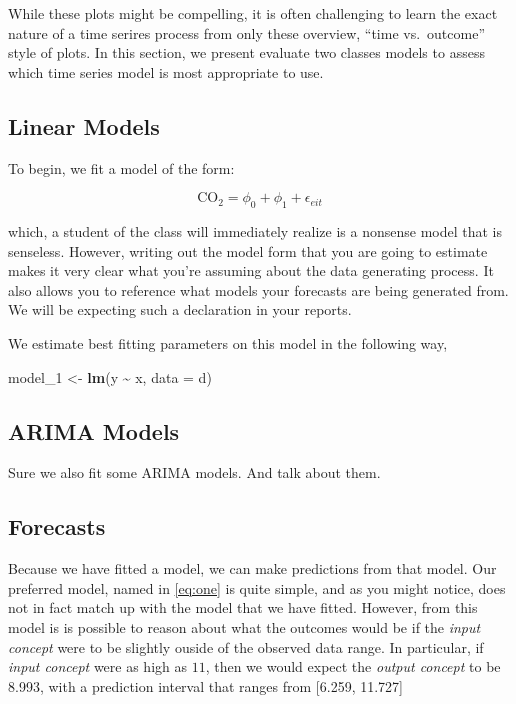 \documentclass[AER]{AEA}
\newenvironment{Shaded}{\begin{snugshade}}{\end{snugshade}}
\newcommand{\AttributeTok}[1]{\textcolor[rgb]{0.13,0.29,0.53}{#1}}
\newcommand{\FunctionTok}[1]{\textcolor[rgb]{0.13,0.29,0.53}{\textbf{#1}}}
\newcommand{\NormalTok}[1]{#1}
\newcommand{\OtherTok}[1]{\textcolor[rgb]{0.56,0.35,0.01}{#1}}
\newcommand{\SpecialCharTok}[1]{\textcolor[rgb]{0.81,0.36,0.00}{\textbf{#1}}}
\begin{document}
While these plots might be compelling, it is often challenging to learn
the exact nature of a time serires process from only these overview,
``time vs.~outcome'' style of plots. In this section, we present
evaluate two classes models to assess which time series model is most
appropriate to use.

\hypertarget{linear-models}{%
\subsection{Linear Models}\label{linear-models}}

To begin, we fit a model of the form:

\begin{equation}
\label{eq:one}
\text{CO}_{2} = \phi_{0} + \phi_{1} + \epsilon_{eit}
\end{equation}

which, a student of the class will immediately realize is a nonsense
model that is senseless. However, writing out the model form that you
are going to estimate makes it very clear what you're assuming about the
data generating process. It also allows you to reference what models
your forecasts are being generated from. We will be expecting such a
declaration in your reports.

We estimate best fitting parameters on this model in the following way,

\begin{Shaded}
\begin{Highlighting}[]
\NormalTok{model\_1 }\OtherTok{\textless{}{-}} \FunctionTok{lm}\NormalTok{(y }\SpecialCharTok{\textasciitilde{}}\NormalTok{ x, }\AttributeTok{data =}\NormalTok{ d)}
\end{Highlighting}
\end{Shaded}

\hypertarget{arima-models}{%
\subsection{ARIMA Models}\label{arima-models}}

Sure we also fit some ARIMA models. And talk about them.

\hypertarget{forecasts}{%
\subsection{Forecasts}\label{forecasts}}

Because we have fitted a model, we can make predictions from that model.
Our preferred model, named in \autoref{eq:one} is quite simple, and as
you might notice, does not in fact match up with the model that we have
fitted. However, from this model is is possible to reason about what the
outcomes would be if the \emph{input concept} were to be slightly ouside
of the observed data range. In particular, if \emph{input concept} were
as high as \(11\), then we would expect the \emph{output concept} to be
8.993, with a prediction interval that ranges from {[}6.259, 11.727{]}
\end{document}
